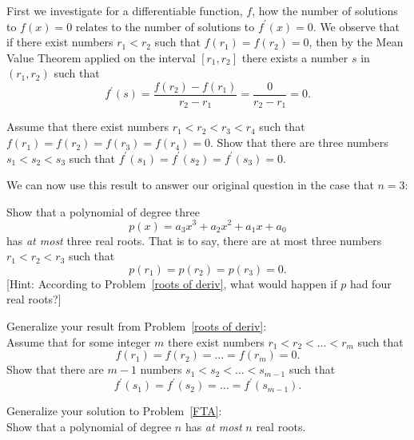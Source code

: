 \documentclass[10pt]{amsart}
\begin{document}



First we investigate for a differentiable function, \(f\), how the number of solutions to \(f(x) = 0\) relates to the number of solutions to \(f^\prime(x) = 0\).
We observe that if there exist numbers \(r_1 < r_2\) such that \(f(r_1) = f(r_2) = 0\), then by the Mean Value Theorem applied on the interval \([r_1, r_2]\) there exists a number \(s\) in \((r_1, r_2)\) such that
\[f^\prime(s) = \frac{f(r_2) - f(r_1)}{r_2 - r_1} = \frac{0}{r_2 - r_1} = 0.\]

\begin{thm}\label{roots of deriv}
  Assume that there exist numbers \(r_1 < r_2 < r_3 < r_4\) such that \(f(r_1) = f(r_2) = f(r_3) = f(r_4) = 0\).
  Show that there are three numbers \(s_1 < s_2 < s_3\) such that \(f^\prime(s_1) = f^\prime(s_2) = f^\prime(s_3) = 0\).
\end{thm}
\newpage

\noindent We can now use this result to answer our original question in the case that \(n = 3\):
\begin{thm}\label{FTA}
  Show that a polynomial of degree three
  \[p(x) = a_3x^3 + a_2x^2 + a_1x +a_0\]
  has \textit{at most} three real roots.
  That is to say, there are at most three numbers \(r_1 < r_2 < r_3\) such that
  \[p(r_1) = p(r_2) = p(r_3) = 0.\]
     {[Hint: According to Problem~\ref{roots of deriv}, what would happen if \(p\) had four real roots?]}
\end{thm}

\vspace{2in}

\begin{thm}
  Generalize your result from Problem~\ref{roots of deriv}:\\

  \noindent Assume that for some integer \(m\) there exist numbers
  \(r_1 < r_2 < \ldots < r_m\)
    such that
    \[f(r_1) = f(r_2) = \ldots = f(r_m) = 0.\]
    Show that there are \(m-1\) numbers
    \(s_1 < s_2 < \ldots < s_{m-1}\)
    such that
    \[f^\prime(s_1) = f^\prime(s_2) = \ldots = f^\prime(s_{m-1}).\]
\end{thm}
\newpage
\begin{thm}
  Generalize your solution to Problem~\ref{FTA}:\\
  
  \noindent Show that a polynomial of degree \(n\) has \textit{at most} \(n\) real roots.
\end{thm}
\end{document}
